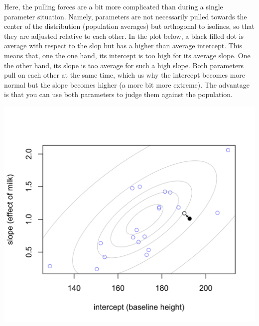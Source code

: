 \documentclass[
]{book}
\begin{document}
Here, the pulling forces are a bit more complicated than during a single parameter situation. Namely, parameters are not necessarily pulled towards the center of the distribution (population averages) but orthogonal to isolines, so that they are adjusted relative to each other. In the plot below, a black filled dot is average with respect to the slop but has a higher than average intercept. This means that, one the one hand, its intercept is too high for its average slope. One the other hand, its slope is too average for such a high slope. Both parameters pull on each other at the same time, which us why the intercept becomes more normal but the slope becomes higher (a more bit more extreme). The advantage is that you can use both parameters to judge them against the population.

\begin{center}\includegraphics[width=22.11in]{images/pooled-correlated-parameters} \end{center}

  
\end{document}
